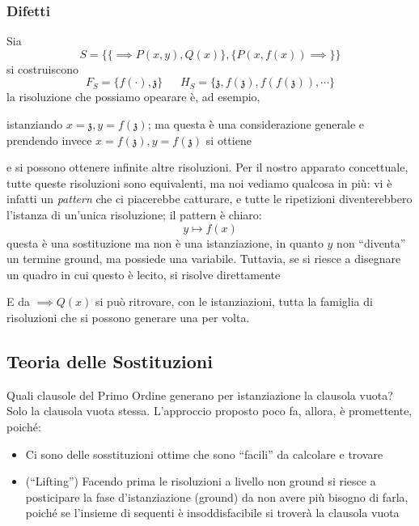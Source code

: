 \subsubsection{Difetti}
Sia 
$$
S = \{ \{\implies P(x,y), Q(x)\}, \{P(x,f(x)) \implies \}\}
$$
si costruiscono 
$$
F_S = \{f(\cdot), \mathfrak{z}\} ~~~~~~~ H_S=\{\mathfrak{z}, f(\mathfrak{z}), f(f(\mathfrak{z})), \cdots \}
$$
la risoluzione che possiamo opearare è, ad esempio, 
\begin{prooftree}
\end{prooftree}
istanziando $x = \mathfrak{z}, y = f(\mathfrak{z})$; ma questa 
è una considerazione generale e prendendo invece 
$x = f(\mathfrak{z}), y = f(\mathfrak{z})$ si ottiene 
\begin{prooftree}
\end{prooftree}
e si possono ottenere infinite altre risoluzioni. Per il nostro 
apparato concettuale, tutte queste risoluzioni sono equivalenti, ma noi 
vediamo qualcosa in più: vi è infatti un \textit{pattern} che ci piacerebbe 
catturare, e tutte le ripetizioni diventerebbero l'istanza di un'unica risoluzione; 
il pattern è chiaro: 
$$
y \mapsto f(x)
$$
questa è una sostituzione ma non è una istanziazione, in quanto $y$ non ``diventa'' 
un termine ground, ma possiede una variabile. Tuttavia, se si riesce a 
disegnare un quadro in cui questo è lecito, si risolve direttamente 
\begin{prooftree}
\end{prooftree}
E da $\implies Q(x)$ si può ritrovare, con le istanziazioni, tutta la famiglia 
di risoluzioni che si possono generare una per volta. 

\subsection{Teoria delle Sostituzioni}
Quali clausole del Primo Ordine generano per istanziazione la clausola vuota?
Solo la clausola vuota stessa. L'approccio proposto poco fa, allora, 
è promettente, poiché: 
\begin{itemize}
        \item Ci sono delle sosstituzioni ottime che sono ``facili'' da calcolare 
                e trovare 
        \item (``Lifting'') Facendo prima le risoluzioni a livello non ground si 
                riesce a posticipare la fase d'istanziazione (ground) da non 
                avere più bisogno di farla, poiché se l'insieme di sequenti 
                è insoddisfacibile si troverà la clausola vuota
\end{itemize}

